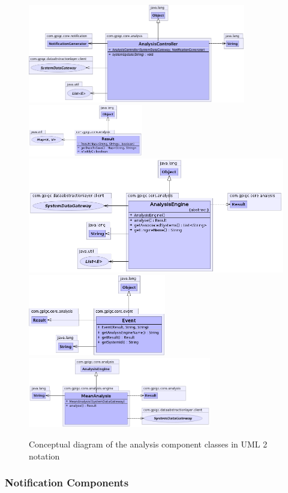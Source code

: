 \documentclass[10pt,a4paper]{article}
\begin{document}
\begin{figure}[ht!]
  \centering
  \includegraphics[width= 9.5cm]{images/Analysis/AnalysisController.png}
  \includegraphics[width= 5cm]{images/Analysis/Result.png}
  \includegraphics[width= 12cm]{images/Analysis/AnalysisEngine.png}
  \includegraphics[width= 6cm]{images/Analysis/Event.png}
  \includegraphics[width= 8cm]{images/Analysis/MeanAnalysis.png}
  \caption{Conceptual diagram of the analysis component classes in
UML 2 notation}
  \label{fig:dataAnalysisComponent}
\end{figure}

\subsubsection*{Notification Components}
\end{document}
